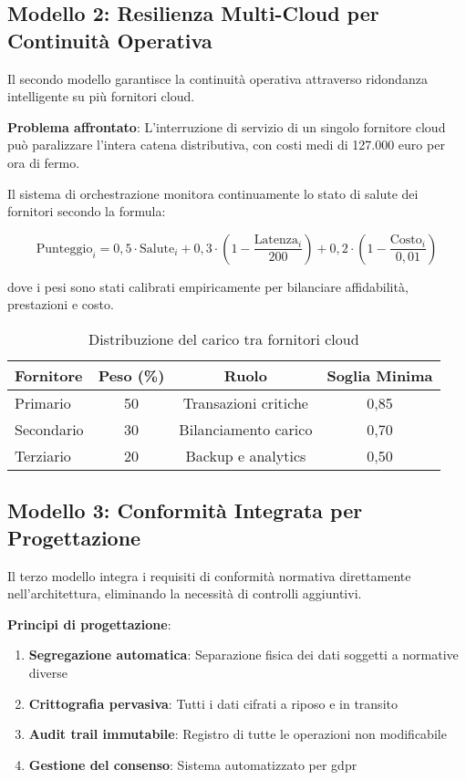 \subsection{Modello 2: Resilienza Multi-Cloud per Continuità Operativa}
\label{subsec:multi-cloud}

Il secondo modello garantisce la continuità operativa attraverso ridondanza intelligente su più fornitori cloud.

\textbf{Problema affrontato}: L'interruzione di servizio di un singolo fornitore cloud può paralizzare l'intera catena distributiva, con costi medi di 127.000 euro per ora di fermo.

Il sistema di orchestrazione monitora continuamente lo stato di salute dei fornitori secondo la formula:

\begin{equation}
\text{Punteggio}_i = 0,5 \cdot \text{Salute}_i + 0,3 \cdot (1 - \frac{\text{Latenza}_i}{200}) + 0,2 \cdot (1 - \frac{\text{Costo}_i}{0,01})
\label{eq:punteggio-provider}
\end{equation}

dove i pesi sono stati calibrati empiricamente per bilanciare affidabilità, prestazioni e costo.

\begin{table}[htbp]
\centering
\caption{Distribuzione del carico tra fornitori cloud}
\label{tab:multi-cloud}
\begin{tabular}{lccc}
\toprule
\textbf{Fornitore} & \textbf{Peso (\%)} & \textbf{Ruolo} & \textbf{Soglia Minima} \\
\midrule
Primario & 50 & Transazioni critiche & 0,85 \\
Secondario & 30 & Bilanciamento carico & 0,70 \\
Terziario & 20 & Backup e analytics & 0,50 \\
\bottomrule
\end{tabular}
\end{table}

\subsection{Modello 3: Conformità Integrata per Progettazione}
\label{subsec:compliance-by-design}

Il terzo modello integra i requisiti di conformità normativa direttamente nell'architettura, eliminando la necessità di controlli aggiuntivi.

\textbf{Principi di progettazione}:
\begin{enumerate}
    \item \textbf{Segregazione automatica}: Separazione fisica dei dati soggetti a normative diverse
    \item \textbf{Crittografia pervasiva}: Tutti i dati cifrati a riposo e in transito
    \item \textbf{Audit trail immutabile}: Registro di tutte le operazioni non modificabile
    \item \textbf{Gestione del consenso}: Sistema automatizzato per \gls{gdpr}
\end{enumerate}

